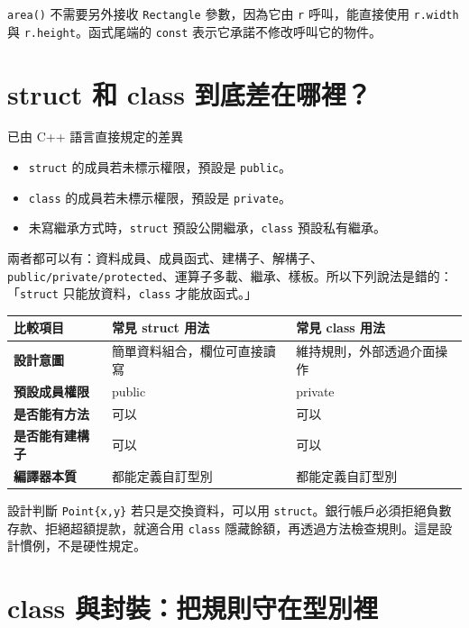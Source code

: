 \documentclass[11pt,a4paper]{article}
\newcommand{\code}[1]{\texttt{#1}}
\begin{document}
\code{area()} 不需要另外接收 \code{Rectangle} 參數，因為它由 \code{r} 呼叫，能直接使用 \code{r.width} 與 \code{r.height}。函式尾端的 \code{const} 表示它承諾不修改呼叫它的物件。

\section{struct 和 class 到底差在哪裡？}

\begin{keybox}{已由 C++ 語言直接規定的差異}
\begin{itemize}
  \item \code{struct} 的成員若未標示權限，預設是 \code{public}。
  \item \code{class} 的成員若未標示權限，預設是 \code{private}。
  \item 未寫繼承方式時，\code{struct} 預設公開繼承，\code{class} 預設私有繼承。
\end{itemize}
\end{keybox}

兩者都可以有：資料成員、成員函式、建構子、解構子、\code{public/private/protected}、運算子多載、繼承、樣板。所以下列說法是錯的：「\code{struct} 只能放資料，\code{class} 才能放函式。」

\begin{longtable}{>{\bfseries}p{31mm}p{56mm}p{56mm}}
\toprule
比較項目 & 常見 struct 用法 & 常見 class 用法 \\
\midrule
\endhead
設計意圖 & 簡單資料組合，欄位可直接讀寫 & 維持規則，外部透過介面操作 \\
預設成員權限 & public & private \\
是否能有方法 & 可以 & 可以 \\
是否能有建構子 & 可以 & 可以 \\
編譯器本質 & 都能定義自訂型別 & 都能定義自訂型別 \\
\bottomrule
\end{longtable}

\begin{examplebox}{設計判斷}
\code{Point\{x,y\}} 若只是交換資料，可以用 \code{struct}。銀行帳戶必須拒絕負數存款、拒絕超額提款，就適合用 \code{class} 隱藏餘額，再透過方法檢查規則。這是設計慣例，不是硬性規定。
\end{examplebox}

\section{class 與封裝：把規則守在型別裡}
\end{document}
